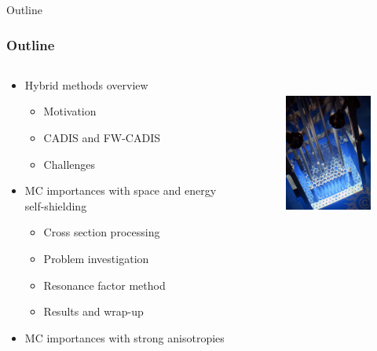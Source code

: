\documentclass[xcolor=x11names,compress]{beamer}
\renewcommand{\(}{\begin{columns}}
\renewcommand{\)}{\end{columns}}
\newcommand{\<}[1]{\begin{column}{#1}}
\renewcommand{\>}{\end{column}}
\begin{document}
\begin{frame}[fragile]{Outline}
  \frametitle{Outline}

\begin{columns}
  \begin{column}{0.6\textwidth}
    \begin{itemize}
    \item Hybrid methods overview
    \begin{itemize}
    		\item Motivation
		\item CADIS and FW-CADIS
		\item Challenges
    \end{itemize}
    	\item MC importances with space and energy self-shielding
	\begin{itemize}
    		\item Cross section processing
		\item Problem investigation
		\item Resonance factor method
		\item Results and wrap-up
  	\end{itemize}
	\item MC importances with strong anisotropies
  \end{itemize}
  \end{column}
  \begin{column}{0.4\textwidth}
  	\begin{figure}
  	\begin{center}
  		\includegraphics[height=2in,clip]{../figs/psu-reactor}
	\end{center}
  	\end{figure}
  \end{column}
\end{columns}

\end{frame}


\end{document}
